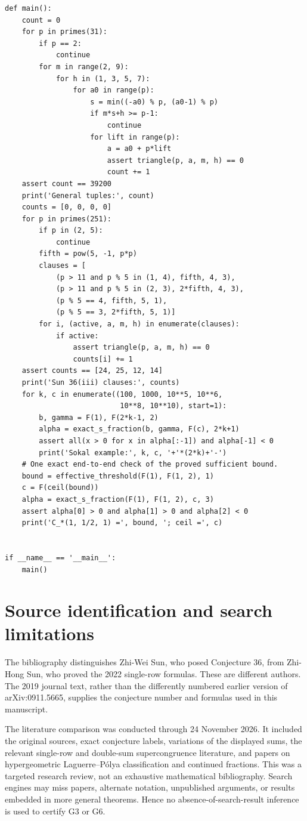 \documentclass[11pt,a4paper]{article}
\theoremstyle{remark}
\begin{document}
\begin{lstlisting}
def main():
    count = 0
    for p in primes(31):
        if p == 2:
            continue
        for m in range(2, 9):
            for h in (1, 3, 5, 7):
                for a0 in range(p):
                    s = min((-a0) % p, (a0-1) % p)
                    if m*s+h >= p-1:
                        continue
                    for lift in range(p):
                        a = a0 + p*lift
                        assert triangle(p, a, m, h) == 0
                        count += 1
    assert count == 39200
    print('General tuples:', count)
    counts = [0, 0, 0, 0]
    for p in primes(251):
        if p in (2, 5):
            continue
        fifth = pow(5, -1, p*p)
        clauses = [
            (p > 11 and p % 5 in (1, 4), fifth, 4, 3),
            (p > 11 and p % 5 in (2, 3), 2*fifth, 4, 3),
            (p % 5 == 4, fifth, 5, 1),
            (p % 5 == 3, 2*fifth, 5, 1)]
        for i, (active, a, m, h) in enumerate(clauses):
            if active:
                assert triangle(p, a, m, h) == 0
                counts[i] += 1
    assert counts == [24, 25, 12, 14]
    print('Sun 36(iii) clauses:', counts)
    for k, c in enumerate((100, 1000, 10**5, 10**6,
                           10**8, 10**10), start=1):
        b, gamma = F(1), F(2*k-1, 2)
        alpha = exact_s_fraction(b, gamma, F(c), 2*k+1)
        assert all(x > 0 for x in alpha[:-1]) and alpha[-1] < 0
        print('Sokal example:', k, c, '+'*(2*k)+'-')
    # One exact end-to-end check of the proved sufficient bound.
    bound = effective_threshold(F(1), F(1, 2), 1)
    c = F(ceil(bound))
    alpha = exact_s_fraction(F(1), F(1, 2), c, 3)
    assert alpha[0] > 0 and alpha[1] > 0 and alpha[2] < 0
    print('C_*(1, 1/2, 1) =', bound, '; ceil =', c)


if __name__ == '__main__':
    main()
\end{lstlisting}

\section{Source identification and search limitations}
The bibliography distinguishes Zhi-Wei Sun, who posed Conjecture 36,
from Zhi-Hong Sun, who proved the 2022 single-row formulas. These are
different authors. The 2019 journal text, rather than the differently
numbered earlier version of arXiv:0911.5665, supplies the conjecture
number and formulas used in this manuscript.

The literature comparison was conducted through 24 November 2026.
It included the original sources, exact conjecture labels, variations
of the displayed sums, the relevant single-row and double-sum
supercongruence literature, and papers on hypergeometric
Laguerre--P\'olya classification and continued fractions. This was a
targeted research review, not an exhaustive mathematical bibliography.
Search engines may miss papers, alternate notation, unpublished
arguments, or results embedded in more general theorems. Hence no
absence-of-search-result inference is used to certify G3 or G6.
\end{document}
